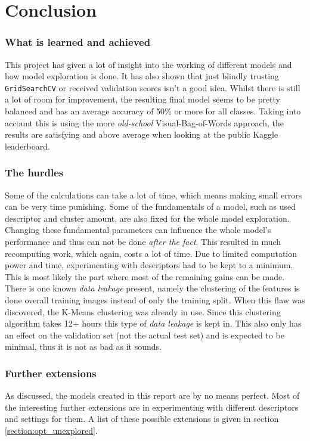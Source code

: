 \part{Conclusion}
\label{part:conclusion}


\section{What is learned and achieved}
\label{section:con_achieved}

This project has given a lot of insight into the working of different models and how model exploration is done.
It has also shown that just blindly trusting \texttt{GridSearchCV} or received validation scores isn't a good idea.
Whilst there is still a lot of room for improvement, the resulting final model seems to be pretty balanced and has an average accuracy of 50\% or more for all classes.
Taking into account this is using the more \textit{old-school} Visual-Bag-of-Words approach, the results are satisfying and above average when looking at the public Kaggle leaderboard.


\section{The hurdles}
\label{section:con_hurdles}

Some of the calculations can take a lot of time, which means making small errors can be very time punishing.
Some of the fundamentals of a model, such as used descriptor and cluster amount, are also fixed for the whole model exploration.
Changing these fundamental parameters can influence the whole model's performance and thus can not be done \textit{after the fact}.
This resulted in much recomputing work, which again, costs a lot of time.
Due to limited computation power and time, experimenting with descriptors had to be kept to a minimum. 
This is most likely the part where most of the remaining gains can be made.
There is one known \textit{data leakage} present, namely the clustering of the features is done overall training images instead of only the training split.
When this flaw was discovered, the K-Means clustering was already in use.
Since this clustering algorithm takes 12+ hours this type of \textit{data leakage} is kept in.
This also only has an effect on the validation set (not the actual test set) and is expected to be minimal, thus it is not as bad as it sounds.


\section{Further extensions}
\label{section:con_extensions}

As discussed, the models created in this report are by no means perfect.
Most of the interesting further extensions are in experimenting with different descriptors and settings for them.
A list of these possible extensions is given in section \ref{section:opt_unexplored}.